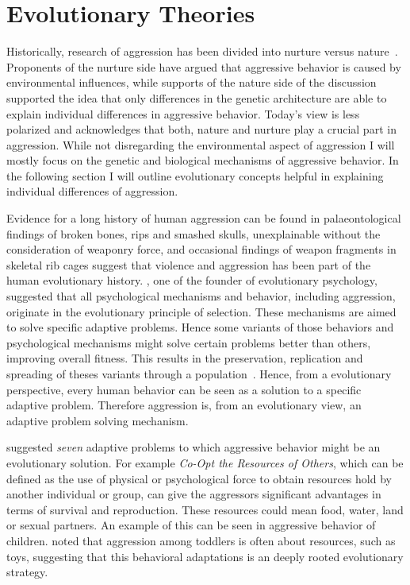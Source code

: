 \section{Evolutionary Theories}
\label{sec:evolutionary_theories}

Historically, research of aggression has been divided into nurture versus nature~\cite{Archer2009}. 
Proponents of the nurture side have argued that aggressive behavior is caused by environmental influences, while supports of the nature side of the discussion supported the idea that only differences in the genetic architecture are able to explain individual differences in aggressive behavior.
Today's view is less polarized and acknowledges that both, nature and nurture play a crucial part in aggression.
While not disregarding the environmental aspect of aggression I will mostly focus on the genetic and biological mechanisms of aggressive behavior.
In the following section I will outline evolutionary concepts helpful in explaining individual differences of aggression. 

Evidence for a long history of human aggression can be found in  palaeontological findings of broken bones, rips and smashed skulls, unexplainable without the consideration of weaponry force, and occasional findings of weapon fragments in skeletal rib cages suggest that violence and aggression has been part of the human evolutionary history. 
\citet{Buss1997}, one of the founder of evolutionary psychology, suggested that all psychological mechanisms and behavior, including aggression, originate in the evolutionary principle of selection.  
These mechanisms are aimed to solve specific adaptive problems.
Hence some variants of those behaviors and psychological mechanisms might solve certain problems better than others, improving overall fitness.
This results in the preservation, replication and spreading of theses variants through a population~\cite{Buss1997}.
Hence, from a evolutionary perspective, every human behavior can be seen as a solution to a specific adaptive problem.
Therefore aggression is, from an evolutionary view, an adaptive problem solving mechanism.

\citet{Buss1997} suggested \textit{seven} adaptive problems to which aggressive behavior might be an evolutionary solution.
For example \textit{Co-Opt the Resources of Others}, which can be defined as the use of physical or psychological force to obtain resources hold by another individual or group, can give the aggressors significant advantages in terms of survival and reproduction.
These resources could mean food, water, land or sexual partners.
An example of this can be seen in aggressive behavior of children.
\citet{Campbell1995} noted that aggression among toddlers is often about resources, such as toys, suggesting that this behavioral adaptations is an deeply rooted evolutionary strategy.

